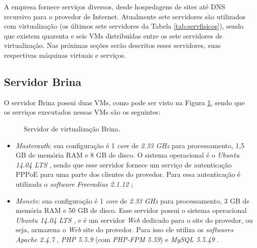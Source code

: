 A empresa fornece serviços diversos, desde hospedagens de sites até \ac{DNS} recursivo para o provedor de Internet. Atualmente sete servidores 
são utilizados com virtualização (os últimos sete servidores da Tabela \ref{tab:servfisicos}), sendo que existem quarenta e seis \ac{VM}s 
distribuídas entre os sete servidores de virtualização. Nas próximas seções serão descritos esses servidores, suas respectivas máquinas virtuais 
e serviços.

\subsection{Servidor Brina}
\label{section:serv_brina}

O servidor Brina possui duas \ac{VM}s, como pode ser visto na Figura \ref{fig:servidor_brina}, sendo que os serviços executados nessas \ac{VM}s
são os seguintes:

\begin{figure}[h!]
 \centering
 \caption{Servidor de virtualização Brina.}
 \label{fig:servidor_brina}
\end{figure}

\begin{itemize}
 \item \textit{Masterauth}: sua configuração é 1 \textit{core} de \textit{2.33 GHz} para processamento, 1,5 GB de memória RAM e 8 GB de disco. 
 O sistema operacional é o \textit{Ubuntu 14.04 \ac{LTS}} \cite{ubuntu}, sendo que esse servidor fornece um serviço de autenticação \ac{PPPoE} para 
 uma parte dos clientes do provedor. Para essa autenticação é utilizada o \textit{software} \textit{Freeradius 2.1.12} \cite{freeradius};
 
 \item \textit{Monete}: sua configuração é 1 \textit{core} de \textit{2.33 GHz} para processamento, 3 GB de memória RAM e 50 GB de disco. 
 Esse servidor possui o sistema operacional \textit{Ubuntu 14.04 \ac{LTS}} \cite{ubuntu}, e é um servidor \textit{Web} dedicado para o site do 
 provedor, ou seja, armazena o \textit{Web} site do provedor. Para isso ele utiliza os \textit{softwares} \textit{Apache 2.4.7} \cite{apache}, 
 \textit{\ac{PHP} 5.5.9} \cite{php} (com \textit{PHP-FPM 5.59}) e \textit{MySQL 5.5.49} \cite{mysql}.
\end{itemize}


